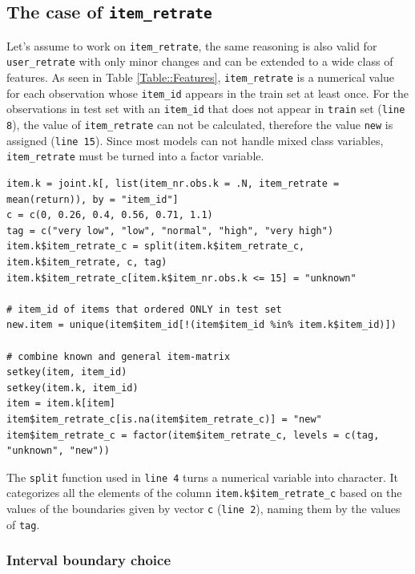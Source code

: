 \documentclass[a4paper,12pt]{article}
\begin{document}
\subsection{The case of \texttt{item\_retrate}}\label{Subsec::ItemRetrate}
Let's assume to work on \texttt{item\_retrate}, the same reasoning is also valid for \texttt{user\_retrate} with only minor changes and can be extended to a wide class of features.
\newline
As seen in Table \ref{Table::Features}, \texttt{item\_retrate} is a numerical value for each observation whose \texttt{item\_id} appears in the train set at least once. 
For the observations in test set with an \texttt{item\_id} that does not appear in \texttt{train} set (\texttt{line 8}), the value of \texttt{item\_retrate} can not be calculated, therefore the value \texttt{new} is assigned (\texttt{line 15}). Since most models can not handle mixed class variables, \texttt{item\_retrate} must be turned into a factor variable. 
\\
\begin{lstlisting}
item.k = joint.k[, list(item_nr.obs.k = .N, item_retrate = mean(return)), by = "item_id"]
c = c(0, 0.26, 0.4, 0.56, 0.71, 1.1)
tag = c("very low", "low", "normal", "high", "very high")
item.k$item_retrate_c = split(item.k$item_retrate_c, item.k$item_retrate, c, tag)
item.k$item_retrate_c[item.k$item_nr.obs.k <= 15] = "unknown"

# item_id of items that ordered ONLY in test set
new.item = unique(item$item_id[!(item$item_id %in% item.k$item_id)])

# combine known and general item-matrix
setkey(item, item_id)
setkey(item.k, item_id)
item = item.k[item]
item$item_retrate_c[is.na(item$item_retrate_c)] = "new"
item$item_retrate_c = factor(item$item_retrate_c, levels = c(tag, "unknown", "new"))

\end{lstlisting}

The \texttt{split} function used in \texttt{line 4} turns a numerical variable into character. It categorizes all the elements of the column \texttt{item.k\$item\_retrate\_c} based on the values of the boundaries given by vector \texttt{c} (\texttt{line 2}), naming them by the values of \texttt{tag}.

\subsubsection{Interval boundary choice}\label{Subsec::Interval}
\end{document}
